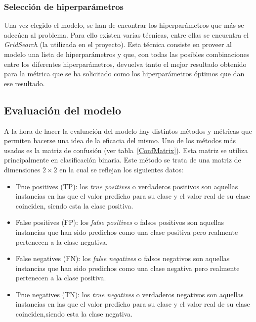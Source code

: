 \subsubsection{Selección de hiperparámetros}

Una vez elegido el modelo, se han de encontrar los hiperparámetros que más se adecúen al problema. Para ello existen varias técnicas, entre ellas se encuentra el \textit{GridSearch} (la utilizada en el proyecto). Esta técnica consiste en proveer al modelo una lista de hiperparámetros y que, con todas las posibles combinaciones entre los diferentes hiperparámetros, devuelva tanto el mejor resultado obtenido para la métrica que se ha solicitado como los hiperparámetros óptimos que dan ese resultado.




\subsection{Evaluación del modelo}


A la hora de hacer la evaluación del modelo hay distintos métodos y métricas que permiten hacerse una idea de la eficacia del mismo. Uno de los métodos más usados es la matriz de confusión (ver tabla~\ref{ConfMatrix}). Esta matriz se utiliza principalmente en clasificación binaria. Este método se trata de una matriz de dimensiones $2\times2$ en la cual se reflejan los siguientes datos:
\begin{itemize}
\item True positives (TP): los \textit{true positives} o verdaderos positivos son aquellas instancias en las que el valor predicho para su clase y el valor real de su clase coinciden, siendo esta la clase positiva. 
\item False positives (FP): los \textit{false positives} o falsos positivos son aquellas instancias que han sido predichos como una clase positiva pero realmente pertenecen a la clase negativa.
\item False negatives (FN): los \textit{false negatives} o falsos negativos son aquellas instancias que han sido predichos como una clase negativa pero realmente pertenecen a la clase positiva.
\item True negatives (TN): los \textit{true negatives} o verdaderos negativos son aquellas instancias en las que el valor predicho para su clase y el valor real de su clase coinciden,siendo esta la clase negativa. 
\end{itemize} 



